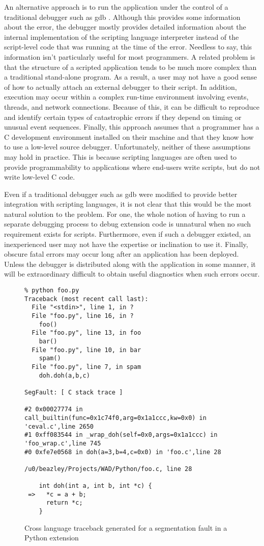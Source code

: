 An alternative approach is to run the application under the control of
a traditional debugger such as gdb \cite{gdb}.  Although this provides
some information about the error, the debugger mostly provides
detailed information about the internal implementation of the
scripting language interpreter instead of the script-level code that
was running at the time of the error.  Needless to say, this information 
isn't particularly useful for most programmers.
A related problem is that
the structure of a scripted application tends to be much more complex
than a traditional stand-alone program.  As a result, a user may not
have a good sense of how to actually attach an external debugger to their
script.  In addition, execution may occur within a
complex run-time environment involving events, threads, and network
connections.  Because of this, it can be difficult to reproduce
and identify certain types of catastrophic errors if they depend on
timing or unusual event sequences. Finally, this approach
assumes that a programmer has a C development environment installed on
their machine and that they know how to use a low-level source
debugger.  Unfortunately, neither of these assumptions may hold in practice.
This is because scripting languages are often used to provide programmability to
applications where end-users write scripts, but do not write low-level C code.

Even if a traditional debugger such as gdb were modified to provide
better integration with scripting languages, it is not clear that this
would be the most natural solution to the problem.  For one, the whole
notion of having to run a separate debugging process to debug
extension code is unnatural when no such requirement exists for
scripts.  Furthermore, even if such a debugger existed, an
inexperienced user may not have the expertise or inclination to use
it.  Finally, obscure fatal errors may occur long after an application
has been deployed.  Unless the debugger is distributed along with the
application in some manner, it will be extraordinary difficult to
obtain useful diagnostics when such errors occur.

\begin{figure*}[t]
{\small
\begin{verbatim}
% python foo.py
Traceback (most recent call last):
  File "<stdin>", line 1, in ?
  File "foo.py", line 16, in ?
    foo()
  File "foo.py", line 13, in foo
    bar()
  File "foo.py", line 10, in bar
    spam()
  File "foo.py", line 7, in spam
    doh.doh(a,b,c)

SegFault: [ C stack trace ]

#2 0x00027774 in call_builtin(func=0x1c74f0,arg=0x1a1ccc,kw=0x0) in 'ceval.c',line 2650
#1 0xff083544 in _wrap_doh(self=0x0,args=0x1a1ccc) in 'foo_wrap.c',line 745
#0 0xfe7e0568 in doh(a=3,b=4,c=0x0) in 'foo.c',line 28

/u0/beazley/Projects/WAD/Python/foo.c, line 28

    int doh(int a, int b, int *c) {
 =>   *c = a + b;
      return *c;
    }
\end{verbatim}
}
\caption{Cross language traceback generated for a segmentation fault in a Python extension}
\end{figure*}

